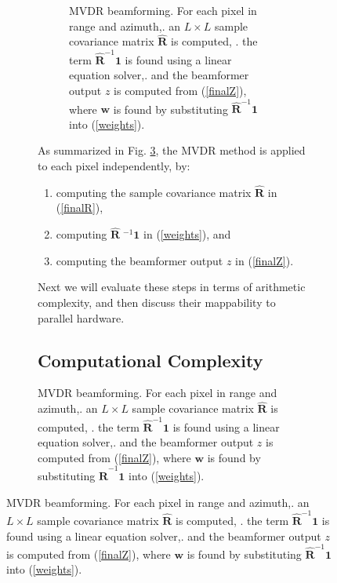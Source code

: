 \documentclass[12pt,journal,draftclsnofoot,onecolumn]{IEEEtran}
\let\MYoriglatexcaption\caption               %
\renewcommand{\caption}[2][\relax]{\MYoriglatexcaption[#2]{#2}}
\renewcommand\vec[1]{\boldsymbol{#1}}
\newcommand\mat[1]{\boldsymbol{#1}}
\newcommand\1{\vec 1}
\newcommand*\w{\vec w}
\newcommand*\eR{\mat{\hat R}}
\newcommand*\eRi{\hat{\mat R}\;\!^{-1}}
\begin{document}
\begin{figure}[H]
\begin{figure}[!t]
\begin{figure}[!t]
\fi%
\caption{MVDR beamforming. For each pixel in range and azimuth,\newline
1. an $L\times{}L$ sample covariance matrix $\eR$ is computed, \newline
2. the term $\eR^{-1}\1$ is found using a linear equation solver,\newline
3. and the beamformer output $z$ is computed from (\ref{finalZ}), where $\w$ is found by substituting $\eR^{-1}\1$ into (\ref{weights}). } \label{mvdr_beamforming}
\end{figure}
As summarized in Fig. \ref{mvdr_beamforming}, the MVDR method is applied to each pixel independently, by:
\begin{enumerate}
\item computing the sample covariance matrix $\eR$ in (\ref{finalR}),
\item computing $\eRi\1$ in (\ref{weights}), and
\item computing the beamformer output $z$ in (\ref{finalZ}).
\end{enumerate}
Next we will evaluate these steps in terms of arithmetic complexity, and then discuss their mappability to parallel hardware.

\subsection{Computational Complexity}

 


\end{figure}
\end{figure}
\end{document}
